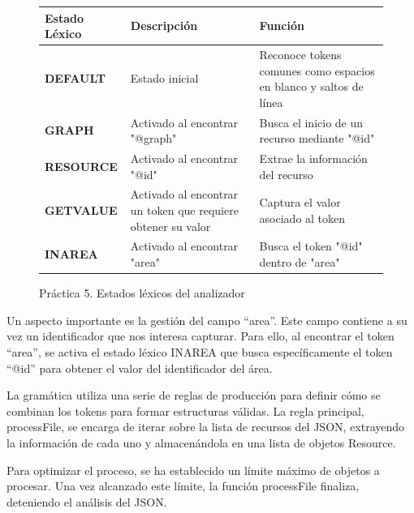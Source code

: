 \begin{figure}[H]
  \centering
  \begin{tabularx}{\textwidth}{>{\bfseries}l X X}
  \toprule
  \textbf{Estado Léxico} & \textbf{Descripción} & \textbf{Función} \\
  \midrule
  DEFAULT & Estado inicial & Reconoce tokens comunes como espacios en blanco y saltos de línea \\
  \midrule
  GRAPH & Activado al encontrar "@graph" & Busca el inicio de un recurso mediante "@id" \\
  \midrule
  RESOURCE & Activado al encontrar "@id" & Extrae la información del recurso \\
  \midrule
  GETVALUE & Activado al encontrar un token que requiere obtener su valor & Captura el valor asociado al token \\
  \midrule
  INAREA & Activado al encontrar "area" & Busca el token "@id" dentro de "area" \\
  \bottomrule
  \end{tabularx}
  \caption{\label{fig:estadoslexicosp5}Práctica 5. Estados léxicos del analizador}
  \label{table:lexical_states}
  \end{figure}

Un aspecto importante es la gestión del campo ``area''. Este campo contiene a su vez un identificador que nos interesa capturar. Para ello, al encontrar el token ``area'', se activa el estado léxico INAREA que busca específicamente el token ``@id'' para obtener el valor del identificador del área.

La gramática utiliza una serie de reglas de producción para definir cómo se combinan los tokens para formar estructuras válidas. La regla principal, processFile, se encarga de iterar sobre la lista de recursos del JSON, extrayendo la información de cada uno y almacenándola en una lista de objetos Resource.

Para optimizar el proceso, se ha establecido un límite máximo de objetos a procesar. Una vez alcanzado este límite, la función processFile finaliza, deteniendo el análisis del JSON.


